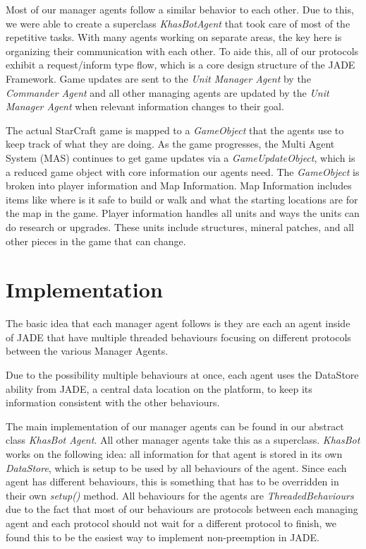 \documentclass[letterpaper]{article}
\begin{document}
Most of our manager agents follow a similar behavior to each other. Due to this, we were able to create a superclass \emph{KhasBotAgent} that took care of most of the repetitive tasks.  With many agents working on separate areas, the key here is organizing their communication with each other.  To aide this, all of our protocols exhibit a request/inform type flow, which is a core design structure of the JADE Framework.  Game updates are sent to the \emph{Unit Manager Agent} by the \emph{Commander Agent} and all other managing agents are updated by the \emph{Unit Manager Agent} when relevant information changes to their goal.

The actual StarCraft game is mapped to a \emph{GameObject} that the agents use to keep track of what they are doing.  As the game progresses, the Multi Agent System (MAS) continues to get game updates via a \emph{GameUpdateObject}, which is a reduced game object with core information our agents need.  The \emph{GameObject} is broken into player information and Map Information. Map Information includes items like where is it safe to build or walk and what the starting locations are for the map in the game.  Player information handles all units and ways the units can do research or upgrades.  These units include structures, mineral patches, and all other pieces in the game that can change.

\section{Implementation}
The basic idea that each manager agent follows is they are each an agent inside of JADE that have multiple threaded behaviours focusing on different protocols between the various Manager Agents.

Due to the possibility multiple behaviours at once, each agent uses the DataStore ability from JADE, a central data location on the platform, to keep its information consistent with the other behaviours.

The main implementation of our manager agents can be found in our abstract class \emph{KhasBot Agent}. All other manager agents take this as a superclass. \emph{KhasBot} works on the following idea: all information for that agent is stored in its own \emph{DataStore}, which is setup to be used by all behaviours of the agent. Since each agent has different behaviours, this is something that has to be overridden in their own \emph{setup()} method. All behaviours for the agents are \emph{ThreadedBehaviours} due to the fact that most of our behaviours are protocols between each managing agent and each protocol should not wait for a different protocol to finish, we found this to be the easiest way to implement non-preemption in JADE.
\end{document}
